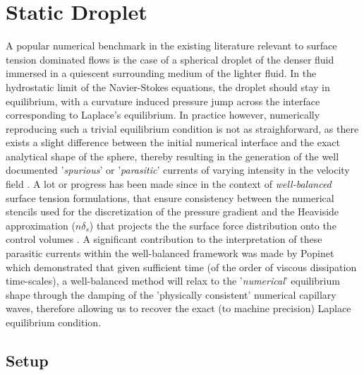 \section{Static Droplet}

A popular numerical benchmark in the existing literature relevant to surface tension dominated flows is the case of a spherical droplet of the denser fluid immersed in a quiescent surrounding medium of the lighter fluid. In the hydrostatic limit of the Navier-Stokes equations, the droplet should stay in equilibrium, with a curvature induced pressure jump across the interface corresponding to Laplace's equilibrium. In practice however, numerically reproducing such a trivial equilibrium condition is not as straighforward, as there exists a slight difference between the initial numerical interface and the exact analytical shape of the sphere, thereby resulting in the generation of the well documented '\textit{spurious}' or '\textit{parasitic}' currents of varying intensity in the velocity field . A lot or progress has been made since in the context of \textit{well-balanced} surface tension formulations, that ensure consistency between the numerical stencils used for the discretization of the pressure gradient and the Heaviside approximation ($n \delta_{s}$) that projects the the surface force distribution onto the control volumes \cite{francois2006balanced,popinet2009accurate}. A significant contribution to the interpretation of these parasitic currents within the well-balanced framework was made by Popinet \cite{popinet2009accurate} which demonstrated that given sufficient time (of the order of viscous dissipation time-scales), a well-balanced method will relax to the '\textit{numerical}' equilibrium shape through the damping of the 'physically consistent' numerical capillary waves, therefore allowing us to recover the exact (to machine precision) Laplace equilibrium condition.

\subsection*{Setup}


